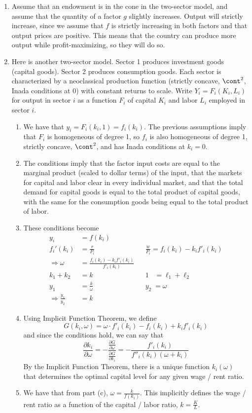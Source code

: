 \documentclass[10pt]{article}
\begin{document}
\begin{enumerate}
	\item Assume that an endowment is in the cone in the two-sector model, and assume that the quantity of a factor $g$ slightly increases. Output will strictly increase, since we assume that $f$ is strictly increasing in both factors and that output prices are positive. This means that the country can produce more output while profit-maximizing, so they will do so.
	\item Here is another two-sector model. Sector 1 produces investment goods (capital goods). Sector 2 produces consumption goods. Each sector is characterized by a neoclassical production function (strictly concave, $\cont^2$, Inada conditions at 0) with constant returns to scale. Write $Y_i = F_i(K_i,L_i)$ for output in sector $i$ as a function $F_i$ of capital $K_i$ and labor $L_i$ employed in sector $i$. \begin{enumerate} \item We have that $y_i = F_i(k_i,1) = f_i(k_i)$. The previous assumptions imply that $F_i$ is homogeneous of degree 1, so $f_i$ is also homogeneous of degree 1, strictly concave, $\cont^2$, and has Inada conditions at $k_i = 0$. \item The conditions imply that the factor input costs are equal to the marginal product (scaled to dollar terms) of the input, that the markets for capital and labor clear in every individual market, and that the total demand for capital goods is equal to the total product of capital goods, with the same for the consumption goods being equal to the total product of labor. \item These conditions become \begin{align*} y_i &= f(k_i) \\ f_i'(k_i) &= \frac{r}{P_i} &&\frac{w}{P_i} = f_i(k_i) - k_i f'_i(k_i) \\ \Longrightarrow \omega &= \frac{f_i(k_i) - k_if'_i(k_i)}{f'_i(k_i)}\\ k_1 + k_2 &= k &&1 \;\;\;= \ell_1 + \ell_2\\ y_1 &= \frac{k}{\omega} &&y_2\; =  \omega  \\ \Longrightarrow \frac{y_1}{y_2} &= k\end{align*} \item Using Implicit Function Theorem, we define \[G(k_i,\omega) = \omega \cdot f'_i(k_i) - f_i(k_i) + k_i f'_i(k_i)\]and since the conditions hold, we can say that \[\frac{\partial k_i}{\partial \omega} = -\frac{\frac{\partial G}{\partial \omega}}{\frac{\partial G}{\partial k_i}} = -\frac{f'_i(k_i)}{f''_i(k_i)(\omega + k_i)}\]By the Implicit Function Theorem, there is a unique function $k_i(\omega)$ that determines the optimal capital level for any given wage / rent ratio. \item We have that from part (c), $\omega = \frac{k}{f(k_1)}$. This implicitly defines the wage / rent ratio as a function of the capital / labor ratio, $k = \frac{K}{L}$.\end{enumerate}
\end{enumerate}
\end{document}
